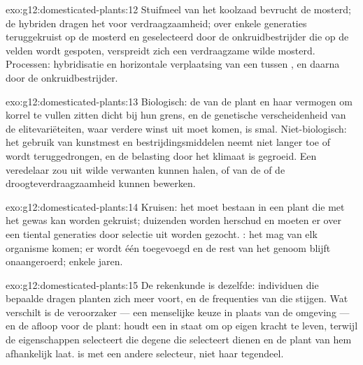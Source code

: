 \begin{solution}{exo:g12:domesticated-plants:12}
Stuifmeel van het koolzaad bevrucht de mosterd; de hybriden dragen het 
voor verdraagzaamheid; over enkele generaties teruggekruist op de mosterd
en geselecteerd door de onkruidbestrijder die op de velden wordt gespoten,
verspreidt zich een verdraagzame wilde mosterd. Processen: hybridisatie en
horizontale verplaatsing van een  tussen , en daarna
 door de onkruidbestrijder.
\end{solution}

\begin{solution}{exo:g12:domesticated-plants:13}
Biologisch: de  van de plant en haar vermogen om korrel te
vullen zitten dicht bij hun grens, en de genetische verscheidenheid van de
elitevariëteiten, waar verdere winst uit moet komen, is smal.
Niet-biologisch: het gebruik van kunstmest en bestrijdingsmiddelen neemt
niet langer toe of wordt teruggedrongen, en de belasting door het klimaat
is gegroeid. Een veredelaar zou  uit wilde verwanten kunnen halen,
of  van de  of de droogteverdraagzaamheid kunnen
bewerken.
\end{solution}

\begin{solution}{exo:g12:domesticated-plants:14}
Kruisen: het  moet bestaan in een plant die met het gewas kan worden
gekruist; duizenden  worden herschud en moeten er over een tiental
generaties door selectie uit worden gezocht. : het  mag van
elk organisme komen; er wordt één  toegevoegd en de rest van het genoom
blijft onaangeroerd; enkele jaren.
\end{solution}

\begin{solution}{exo:g12:domesticated-plants:15}
De rekenkunde is dezelfde: individuen die bepaalde  dragen planten
zich meer voort, en de frequenties van die  stijgen. Wat verschilt
is de veroorzaker --- een menselijke keuze in plaats van de omgeving ---
en de afloop voor de plant:  houdt een  in staat
om op eigen kracht te leven, terwijl de  eigenschappen
selecteert die degene die selecteert dienen en de plant van hem
afhankelijk laat.  is  met een andere
selecteur, niet haar tegendeel.
\end{solution}

